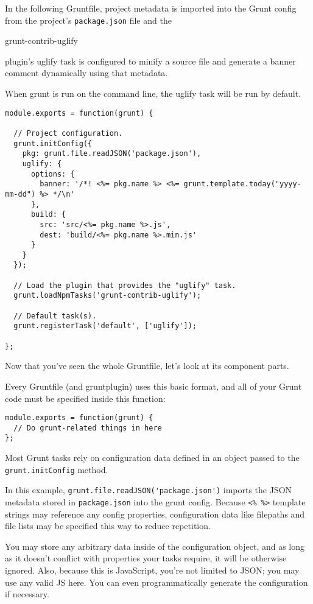 
In the following Gruntfile, project metadata is imported into the Grunt
config from the project's \verb|package.json| file and the 

grunt-contrib-uglify

plugin's uglify task is configured to minify a source file and generate
a banner comment dynamically using that metadata. 

When grunt is run on
the command line, the uglify task will be run by default.

\begin{verbatim}
module.exports = function(grunt) {

  // Project configuration.
  grunt.initConfig({
    pkg: grunt.file.readJSON('package.json'),
    uglify: {
      options: {
        banner: '/*! <%= pkg.name %> <%= grunt.template.today("yyyy-mm-dd") %> */\n'
      },
      build: {
        src: 'src/<%= pkg.name %>.js',
        dest: 'build/<%= pkg.name %>.min.js'
      }
    }
  });

  // Load the plugin that provides the "uglify" task.
  grunt.loadNpmTasks('grunt-contrib-uglify');

  // Default task(s).
  grunt.registerTask('default', ['uglify']);

};
\end{verbatim}
Now that you've seen the whole Gruntfile, let's look at its component parts.


Every Gruntfile (and gruntplugin) uses this basic format, and all of your Grunt code must be specified inside this function:

\begin{verbatim}
module.exports = function(grunt) {
  // Do grunt-related things in here
};
\end{verbatim}


Most Grunt tasks rely on configuration data defined in an object passed to the \verb|grunt.initConfig| method.

In this example, 
\verb|grunt.file.readJSON('package.json')| 
imports the JSON metadata stored in 
\verb|package.json| into the grunt config. 
Because \verb|<% %>| template strings may reference any config properties, configuration data like filepaths and file lists may be specified this way to reduce repetition.

You may store any arbitrary data inside of the configuration object,
and as long as it doesn't conflict with properties your tasks require,
it will be otherwise ignored. Also, because this is JavaScript, you're
not limited to JSON; you may use any valid JS here. You can even
programmatically generate the configuration if necessary.

